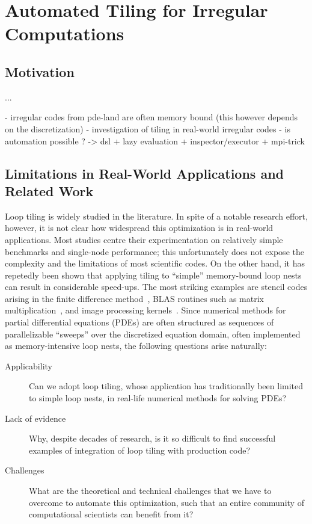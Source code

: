 \chapter{Automated Tiling for Irregular Computations}
\label{ch:sparsetiling}

\section{Motivation}
...

- irregular codes from pde-land are often memory bound (this however depends on the discretization)
- investigation of tiling in real-world irregular codes
- is automation possible ? -> dsl + lazy evaluation + inspector/executor + mpi-trick

\section{Limitations in Real-World Applications and Related Work}
\label{sec:tiling:limits}
Loop tiling is widely studied in the literature. In spite of a notable research effort, however, it is not clear how widespread this optimization is in real-world applications. Most studies centre their experimentation on relatively simple benchmarks and single-node performance; this unfortunately does not expose the complexity and the limitations of most scientific codes. On the other hand, it has repetedly been shown that applying tiling to ``simple'' memory-bound loop nests can result in considerable speed-ups. The most striking examples are stencil codes arising in the finite difference method~\cite{stencil-tiling}, BLAS routines such as matrix multiplication~\cite{MKL}, and image processing kernels~\cite{Halide}. Since numerical methods for partial differential equations (PDEs) are often structured as sequences of parallelizable ``sweeps'' over the discretized equation domain, often implemented as memory-intensive loop nests, the following questions arise naturally: 

\begin{description}
\item[Applicability] Can we adopt loop tiling, whose application has traditionally been limited to simple loop nests, in real-life numerical methods for solving PDEs?
\item[Lack of evidence] Why, despite decades of research, is it so difficult to find successful examples of integration of loop tiling with production code? 
\item[Challenges] What are the theoretical and technical challenges that we have to overcome to automate this optimization, such that an entire community of computational scientists can benefit from it?
\end{description}

